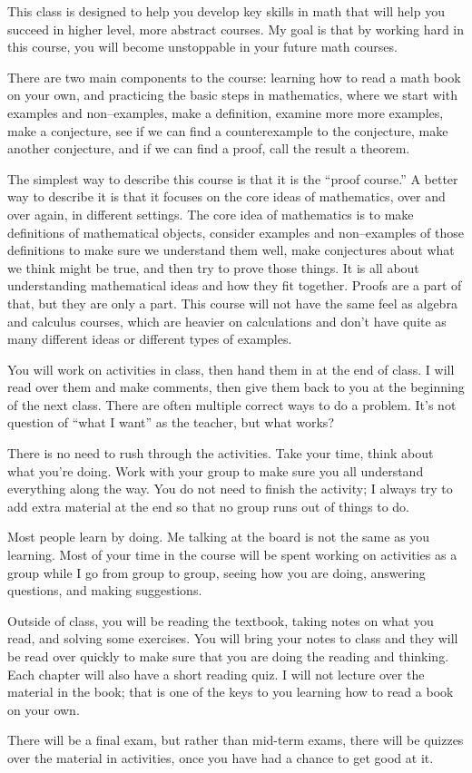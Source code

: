 
This class is designed to help you develop key skills in math that will help you succeed in higher level, more abstract courses.
My goal is that by working hard in this course, you will become unstoppable in your future math courses.

There are two main components to the course:  learning how to read a math book on your own, and practicing the basic steps in mathematics, where we start with examples and non--examples, make a definition, examine more more examples, make a conjecture, see if we can find a counterexample to the conjecture, make another conjecture, and if we can find a proof, call the result a theorem.

The simplest way to describe this course is that it is the ``proof course.''
A better way to describe it is that it focuses on the core ideas of mathematics, over and over again, in different settings.
The core idea of mathematics is to make definitions of mathematical objects, consider examples and non--examples of those definitions to make sure we understand them well, make conjectures about what we think might be true, and then try to prove those things.
It is all about understanding mathematical ideas and how they fit together.
Proofs are a part of that, but they are only a part.
This course will not have the same feel as algebra and calculus courses, which are heavier on calculations and don't have quite as many different ideas or different types of examples.

You will work on activities in class, then hand them in at the end of class.
I will read over them and make comments, then give them back to you at the beginning of the next class.
There are often multiple correct ways to do a problem.
It's not question of ``what I want'' as the teacher, but what works?

There is no need to rush through the activities.
Take your time, think about what you're doing.
Work with your group to make sure you all understand everything along the way.
You do not need to finish the activity; I always try to add extra material at the end so that no group runs out of things to do.

Most people learn by doing.
Me talking at the board is not the same as you learning.
Most of your time in the course will be spent working on activities as a group while I go from group to group, seeing how you are doing, answering questions, and making suggestions.

Outside of class, you will be reading the textbook, taking notes on what you read, and solving some exercises.
You will bring your notes to class and they will be read over quickly to make sure that you are doing the reading and thinking.
Each chapter will also have a short reading quiz.
I will not lecture over the material in the book; that is one of the keys to you learning how to read a book on your own.

There will be a final exam, but rather than mid-term exams, there will be quizzes over the material in activities, once you have had a chance to get good at it.
